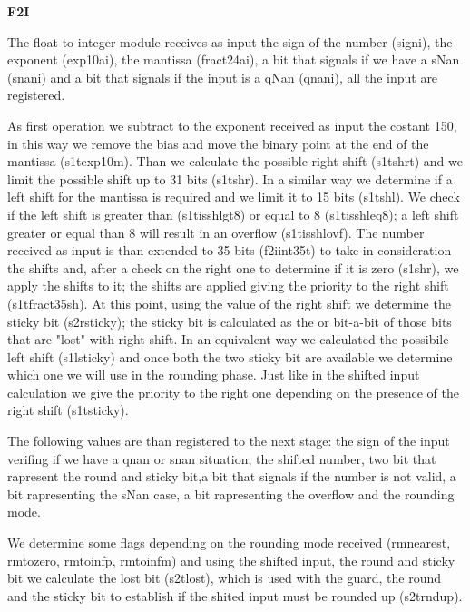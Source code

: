 \textbf{F2I}
\newline

The float to integer module receives as input the sign of the number (sign\textunderscore i), the exponent (exp10a\textunderscore i), the mantissa (fract24a\textunderscore i), a bit that signals if we have a sNan (snan\textunderscore i) and a bit that signals if the input is a qNan (qnan\textunderscore i), all the input are registered.

As first operation we subtract to the exponent received as input the costant 150, in this way we remove the bias and move the binary point at the end of the mantissa (s1t\textunderscore exp10m).
Than we calculate the possible right shift (s1t\textunderscore shr\textunderscore t) and we limit the possible shift up to 31 bits (s1t\textunderscore shr). In a similar way we determine if a left shift for the mantissa is required and we limit it to 15 bits (s1t\textunderscore shl). We check if the left shift is greater than (s1t\textunderscore is\textunderscore shl\textunderscore gt8) or equal to 8 (s1t\textunderscore is\textunderscore shl\textunderscore eq8); a left shift greater or equal than 8 will result in an overflow (s1t\textunderscore is\textunderscore shl\textunderscore ovf). 
The number received as input is than extended to 35 bits (f2i\textunderscore int35\textunderscore t) to take in consideration the shifts and, after a check on the right one to determine if it is zero (s1\textunderscore shr), we apply the shifts to it; the shifts are applied giving the priority to the right shift (s1t\textunderscore fract35sh). 
At this point, using the value of the right shift we determine the sticky bit (s2r\textunderscore sticky); the sticky bit is calculated as the or bit-a-bit of those bits that are "lost" with right shift.
In an equivalent way we calculated the possibile left shift (s1l\textunderscore sticky) and once both the two sticky bit are available we determine which one we will use in the rounding phase. Just like in the shifted input calculation we give the priority to the right one depending on the presence of the right shift (s1t\textunderscore sticky).

The following values are than registered to the next stage: the sign of the input verifing if we have a qnan or snan situation, the shifted number, two bit that rapresent the round and sticky bit,a bit that signals if the number is not valid, a bit rapresenting the sNan case, a bit rapresenting the overflow and the rounding mode.

We determine some flags depending on the rounding mode received (rm\textunderscore nearest, rm\textunderscore to\textunderscore zero, rm\textunderscore to\textunderscore infp, rm\textunderscore to\textunderscore infm) and using the shifted input, the round and sticky bit we calculate the lost bit (s2t\textunderscore lost), which is used with the guard, the round and the sticky bit to establish if the shited input must be rounded up (s2t\textunderscore rnd\textunderscore up).

